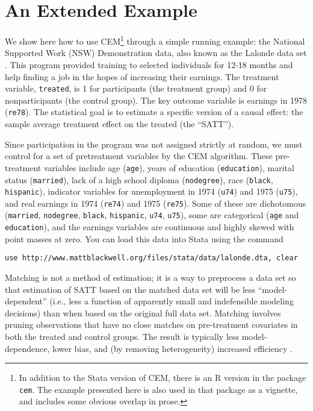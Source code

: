 \documentclass[11pt]{article}
\begin{document}
\section{An Extended Example}
We show here how to use CEM\footnote{In addition to the Stata version
  of CEM, there is an R version in the package \texttt{cem}. The
  example presented here is also used in that package as a vignette,
  and includes some obvious overlap in prose.} through a simple
running example: the National Supported Work (NSW) Demonstration data,
also known as the Lalonde data set \citep{Lalonde86}.  This program
provided training to selected individuals for 12-18 months and help
finding a job in the hopes of increasing their earnings.  The
treatment variable, \texttt{treated}, is 1 for participants (the
treatment group) and 0 for nonparticipants (the control group).  The
key outcome variable is earnings in 1978 (\texttt{re78}).  The
statistical goal is to estimate a specific version of a causal effect:
the sample average treatment effect on the treated (the ``SATT'').

Since participation in the program was not assigned strictly at random, we
must control for a set of pretreatment variables by the CEM algorithm.
These pre-treatment variables include age (\texttt{age}), years of
education (\texttt{education}), marital status (\texttt{married}), lack of
a high school diploma (\texttt{nodegree}), race (\texttt{black},
\texttt{hispanic}), indicator variables for unemployment in 1974
(\texttt{u74}) and 1975 (\texttt{u75}), and real earnings in 1974
(\texttt{re74}) and 1975 (\texttt{re75}).  Some of these are dichotomous
(\texttt{married}, \texttt{nodegree}, \texttt{black}, \texttt{hispanic},
\texttt{u74}, \texttt{u75}), some are categorical (\texttt{age} and
\texttt{education}), and the earnings variables are continuous and highly
skewed with point masses at zero. You can load this data into Stata using
the command

\begin{verbatim}
use http://www.mattblackwell.org/files/stata/data/lalonde.dta, clear
\end{verbatim}

Matching is not a method of estimation; it is a way to preprocess a
data set so that estimation of SATT based on the matched data set will
be less ``model-dependent'' (i.e., less a function of apparently small
and indefensible modeling decisions) than when based on the original
full data set.  Matching involves pruning observations that have no
close matches on pre-treatment covariates in both the treated and
control groups.  The result is typically less model-dependence, lower bias,
and (by removing heterogeneity) increased efficiency
\citep{KinZen06,HoImaKin07,IacKinPor11c}.
\end{document}
